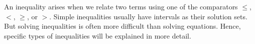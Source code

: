 



%
%

\begin{MSectionStart}

An inequality arises when we relate two terms using one of the comparators $\leq$, $<$, $\geq$, or $>$. Simple 
inequalities usually have intervals as their solution sets. But solving inequalities is often
more difficult than solving equations. Hence, specific types of inequalities will be explained
in more detail.


\MModstartBox
\end{MSectionStart}


